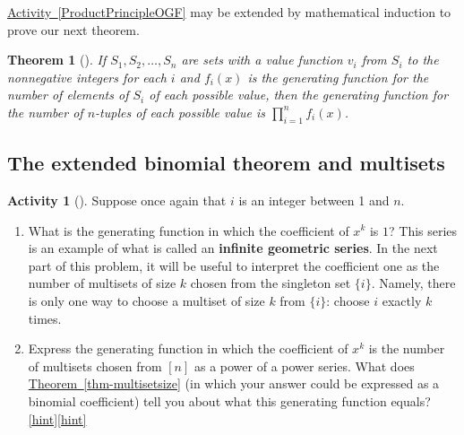 \documentclass[10pt,]{book}
\newcommand{\terminology}[1]{\textbf{#1}}
\theoremstyle{plain}
\newtheorem{theorem}{Theorem}[section]
\theoremstyle{definition}
\theoremstyle{definition}
\theoremstyle{definition}
\newtheorem{activity}[project]{Activity}
\numberwithin{equation}{chapter}
\begin{document}
\hypertarget{p-1302}{}%
\hyperref[ProductPrincipleOGF]{Activity~\ref{ProductPrincipleOGF}} may be extended by mathematical induction to prove our next theorem.%
\begin{theorem}[{}]\label{theorem-14}
\hypertarget{p-1303}{}%
If \(S_1,S_2,\dots,S_n\) are sets with a value function \(v_i\) from \(S_i\) to the nonnegative integers for each \(i\) and \(f_i(x)\) is the generating function for the number of elements of \(S_i\) of each possible value, then the generating function for the number of \(n\)-tuples of each possible value is \(\prod_{i=1}^n f_i(x)\).%
\end{theorem}
\typeout{************************************************}
\typeout{************************************************}
\subsection[{The extended binomial theorem and multisets}]{The extended binomial theorem and multisets}\label{subsection-35}
\begin{activity}[]\label{activity-243}
\hypertarget{p-1304}{}%
Suppose once again that \(i\) is an integer between 1 and \(n\).%
\begin{enumerate}[font=\bfseries,label=(\alph*),ref=\alph*]
\item\label{task-242} \hypertarget{p-1305}{}%
What is the generating function in which the coefficient of \(x^k\) is \(1\)? This series is an example of what is called an \terminology{infinite geometric series}. In the next part of this problem, it will be useful to interpret the coefficient one as the number of multisets of size \(k\) chosen from the singleton set \(\{i\}\). Namely, there is only one way to choose a multiset of size \(k\) from \(\{i\}\): choose \(i\) exactly \(k\) times.%
\item\label{task-243} \hypertarget{p-1307}{}%
Express the generating function in which the coefficient of \(x^k\) is the number of multisets chosen from \([n]\) as a power of a power series.  What does \hyperref[thm-multisetsize]{Theorem~\ref{thm-multisetsize}} (in which your answer could be expressed as a binomial coefficient) tell you about what this generating function equals?%
\hfill{\tiny\hyperlink{a-250.b}{[hint]}\hypertarget{q-250.b}{}}\hfill{\tiny\hyperlink{a-250.b}{[hint]}\hypertarget{q-250.b}{}}\end{enumerate}
\end{activity}
\end{document}
